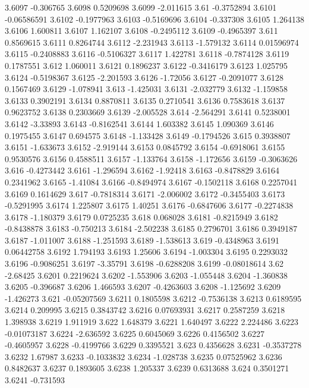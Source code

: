 3.6097  -0.306765
3.6098  0.5209698
3.6099  -2.011615
3.61  -0.3752894
3.6101  -0.06586591
3.6102  -0.1977963
3.6103  -0.5169696
3.6104  -0.337308
3.6105  1.264138
3.6106  1.600811
3.6107  1.162107
3.6108  -0.2495112
3.6109  -0.4965397
3.611  0.8569615
3.6111  0.8264744
3.6112  -2.231943
3.6113  -1.579132
3.6114  0.01596974
3.6115  -0.2408883
3.6116  -0.5106327
3.6117  1.422781
3.6118  -0.7874128
3.6119  0.1787551
3.612  1.060011
3.6121  0.1896237
3.6122  -0.3416179
3.6123  1.025795
3.6124  -0.5198367
3.6125  -2.201593
3.6126  -1.72056
3.6127  -0.2091077
3.6128  0.1567469
3.6129  -1.078941
3.613  -1.425031
3.6131  -2.032779
3.6132  -1.159858
3.6133  0.3902191
3.6134  0.8870811
3.6135  0.2710541
3.6136  0.7583618
3.6137  0.9623752
3.6138  0.2303669
3.6139  -2.005528
3.614  -2.564291
3.6141  0.5238001
3.6142  -3.33893
3.6143  -0.8162541
3.6144  1.603382
3.6145  1.090369
3.6146  0.1975455
3.6147  0.694575
3.6148  -1.133428
3.6149  -0.1794526
3.615  0.3938807
3.6151  -1.633673
3.6152  -2.919144
3.6153  0.0845792
3.6154  -0.6918061
3.6155  0.9530576
3.6156  0.4588511
3.6157  -1.133764
3.6158  -1.172656
3.6159  -0.3063626
3.616  -0.4273442
3.6161  -1.296594
3.6162  -1.92418
3.6163  -0.8478829
3.6164  0.2341962
3.6165  -1.41084
3.6166  -0.8494974
3.6167  -0.1502118
3.6168  0.2257041
3.6169  0.1614629
3.617  -0.7818314
3.6171  -2.006002
3.6172  -0.3455403
3.6173  -0.5291995
3.6174  1.225807
3.6175  1.40251
3.6176  -0.6847606
3.6177  -0.2274838
3.6178  -1.180379
3.6179  0.0725235
3.618  0.068028
3.6181  -0.8215949
3.6182  -0.8438878
3.6183  -0.750213
3.6184  -2.502238
3.6185  0.2796701
3.6186  0.3949187
3.6187  -1.011007
3.6188  -1.251593
3.6189  -1.538613
3.619  -0.4348963
3.6191  0.06442758
3.6192  1.794193
3.6193  1.25606
3.6194  -1.003304
3.6195  0.2293032
3.6196  -0.9086251
3.6197  -3.35791
3.6198  -0.6288208
3.6199  -0.08018614
3.62  -2.68425
3.6201  0.2219624
3.6202  -1.553906
3.6203  -1.055448
3.6204  -1.360838
3.6205  -0.396687
3.6206  1.466593
3.6207  -0.4263603
3.6208  -1.125692
3.6209  -1.426273
3.621  -0.05207569
3.6211  0.1805598
3.6212  -0.7536138
3.6213  0.6189595
3.6214  0.209995
3.6215  0.3843742
3.6216  0.07693931
3.6217  0.2587259
3.6218  1.398938
3.6219  1.911919
3.622  1.648379
3.6221  1.640497
3.6222  2.224486
3.6223  -0.01073187
3.6224  -2.636592
3.6225  0.6045069
3.6226  0.4156502
3.6227  -0.4605957
3.6228  -0.4199766
3.6229  0.3395521
3.623  0.4356628
3.6231  -0.3537278
3.6232  1.67987
3.6233  -0.1033832
3.6234  -1.028738
3.6235  0.07525962
3.6236  0.8482637
3.6237  0.1893605
3.6238  1.205337
3.6239  0.6313688
3.624  0.3501271
3.6241  -0.731593
